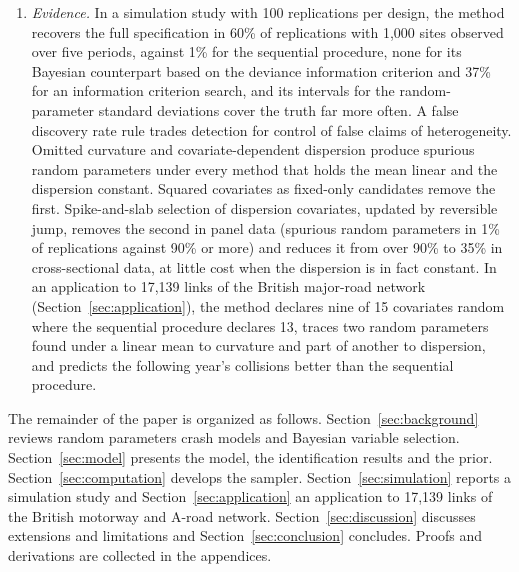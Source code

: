 \begin{enumerate}[label=(\roman*),leftmargin=*]
\item \emph{Evidence.} In a simulation study with 100 replications per design, the method recovers the full specification in 60\% of replications with 1{,}000 sites observed over five periods, against 1\% for the sequential procedure, none for its Bayesian counterpart based on the deviance information criterion and 37\% for an information criterion search, and its intervals for the random-parameter standard deviations cover the truth far more often. A false discovery rate rule trades detection for control of false claims of heterogeneity. Omitted curvature and covariate-dependent dispersion produce spurious random parameters under every method that holds the mean linear and the dispersion constant. Squared covariates as fixed-only candidates remove the first. Spike-and-slab selection of dispersion covariates, updated by reversible jump, removes the second in panel data (spurious random parameters in 1\% of replications against 90\% or more) and reduces it from over 90\% to 35\% in cross-sectional data, at little cost when the dispersion is in fact constant. In an application to 17{,}139 links of the British major-road network (Section~\ref{sec:application}), the method declares nine of 15 covariates random where the sequential procedure declares 13, traces two random parameters found under a linear mean to curvature and part of another to dispersion, and predicts the following year's collisions better than the sequential procedure.
\end{enumerate}

The remainder of the paper is organized as follows. Section~\ref{sec:background} reviews random parameters crash models and Bayesian variable selection. Section~\ref{sec:model} presents the model, the identification results and the prior. Section~\ref{sec:computation} develops the sampler. Section~\ref{sec:simulation} reports a simulation study and Section~\ref{sec:application} an application to 17{,}139 links of the British motorway and A-road network. Section~\ref{sec:discussion} discusses extensions and limitations and Section~\ref{sec:conclusion} concludes. Proofs and derivations are collected in the appendices.
